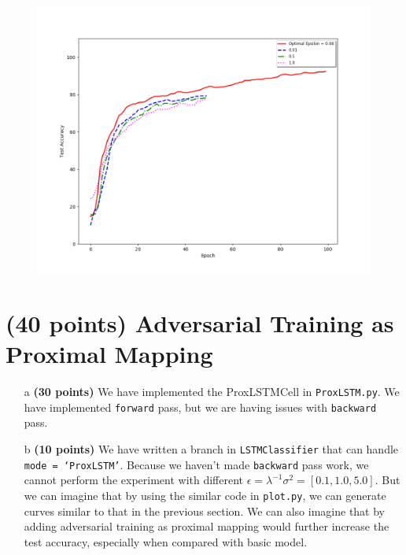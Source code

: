\documentclass[11pt]{report}
\begin{document}
\begin{itemize}
    \begin{figure}[h]
    	\includegraphics[width = 15 cm]{AdvModel.png}
    	\centering
	\end{figure}

\end{itemize}

	


\section{(40 points) Adversarial Training as Proximal Mapping}
\begin{itemize}
    \item[a] \textbf{(30 points)} We have implemented the ProxLSTMCell in \texttt{ProxLSTM.py}. We have implemented \texttt{forward} pass, but we are having issues with \texttt{backward} pass. 
    \item[b] \textbf{(10 points)} We have written a branch in \texttt{LSTMClassifier} that can handle \texttt{mode = `ProxLSTM'}. 
    Because we haven't made \texttt{backward} pass work, we cannot perform the experiment with different $\epsilon = \lambda^{-1}\sigma^2 = [0.1, 1.0, 5.0]$. 
    But we can imagine that by using the similar code in \texttt{plot.py}, we can generate curves similar to that in the previous section. 
    We can also imagine that by adding adversarial training as proximal mapping would further increase the test accuracy, especially when compared with basic model. 
\end{itemize}
\end{document}

